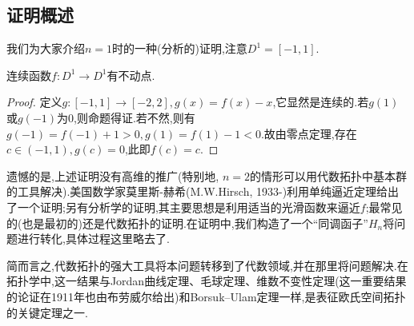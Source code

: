 \documentclass[main]{subfiles}
\begin{document}
\subsection*{证明概述}
我们为大家介绍$n=1$时的一种(分析的)证明,注意$D^1=[-1,1]$.
\begin{theorem}
连续函数$f:D^1\to D^1$有不动点.
\end{theorem}
\begin{proof}
定义$g:[-1,1]\to[-2,2],g(x)=f(x)-x$,它显然是连续的.若$g(1)$或$g(-1)$为0,则命题得证.若不然,则有$g(-1)=f(-1)+1>0,g(1)=f(1)-1<0$.故由零点定理,存在$c\in(-1,1),g(c)=0$,此即$f(c)=c$.
\end{proof}
\begin{figure}[H]
	\centering
\end{figure}
遗憾的是,上述证明没有高维的推广(特别地, $n=2$的情形可以用代数拓扑中基本群的工具解决).美国数学家莫里斯-赫希(M.W.Hirsch, 1933-)利用单纯逼近定理给出了一个证明;另有分析学的证明,其主要思想是利用适当的光滑函数来逼近$f$;最常见的(也是最初的)还是代数拓扑的证明.在证明中,我们构造了一个“同调函子”$H_n$将问题进行转化,具体过程这里略去了.

简而言之,代数拓扑的强大工具将本问题转移到了代数领域,并在那里将问题解决.在拓扑学中,这一结果与Jordan曲线定理、毛球定理、维数不变性定理(这一重要结果的论证在1911年也由布劳威尔给出)和Borsuk–Ulam定理一样,是表征欧氏空间拓扑的关键定理之一.
\end{document}

